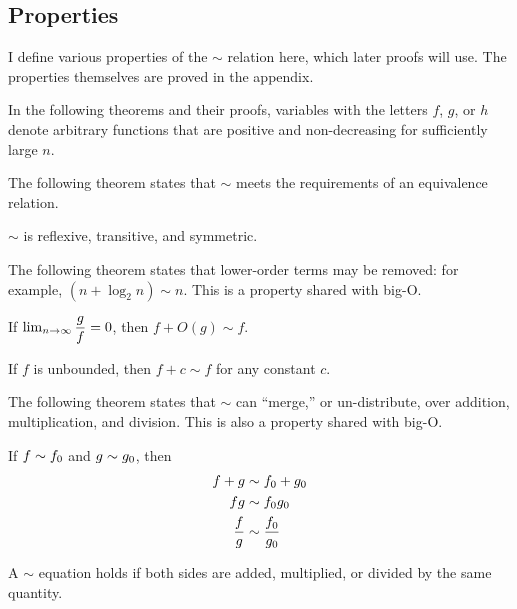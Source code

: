 \subsection{Properties}
\label{subsec:AsymptoticProperties}

I define various properties of the $\sim$ relation here, which later proofs will use. The properties themselves are proved in the appendix.

In the following theorems and their proofs, variables with the letters $f$, $g$, or $h$ denote arbitrary functions that are positive and non-decreasing for sufficiently large $n$.

The following theorem states that $\sim$ meets the requirements of an equivalence relation.

\begin{theorem}
\label{thm:EquivalenceRelation}
	$\sim$ is reflexive, transitive, and symmetric.
\end{theorem}

The following theorem states that lower-order terms may be removed: for example, $(n + \log_2 n) \sim n$. This is a property shared with big-O.

\begin{theorem}
\label{thm:RemovesLowerOrderTerms}
	If $\lim_{n \to \infty} \dfrac{g}{f} = 0$, then $f + O(g) \sim f$.
\end{theorem}

\begin{corollary}
\label{coro:PlusConstant}
	If $f$ is unbounded, then $f + c \sim f$ for any constant $c$.
\end{corollary}

The following theorem states that $\sim$ can ``merge,'' or un-distribute, over addition, multiplication, and division. This is also a property shared with big-O.

\begin{theorem}
\label{thm:MergesOverOps}
	If $f \sim f_0$ and $g \sim g_0$, then
	\begin{align*}
	f + g &\sim f_0 + g_0\\
	fg &\sim f_0g_0\\
	\frac{f}{g} &\sim \frac {f_0} {g_0}
	\end{align*}
\end{theorem}

\begin{corollary}
\label{coro:BothSides}
	A $\sim$ equation holds if both sides are added, multiplied, or divided by the same quantity.
\end{corollary}

